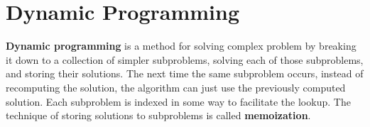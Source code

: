 \section{Dynamic Programming}  

\textbf{Dynamic programming} is a method for solving complex problem by breaking it down to a collection of simpler subproblems, solving each of those subproblems, and storing their solutions. The next time the same subproblem occurs, instead of recomputing the solution, the algorithm can just use the previously computed solution. Each subproblem is indexed in some way to facilitate the lookup. The technique of storing solutions to subproblems is called \textbf{memoization}.